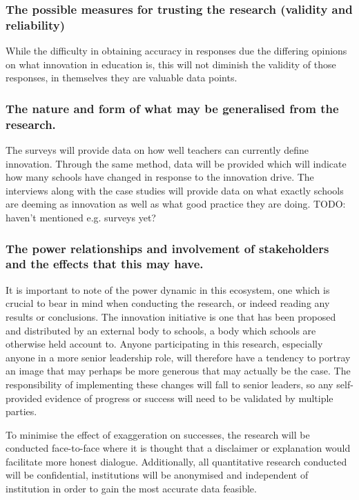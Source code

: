 \subsubsection{The possible measures for trusting the research (validity and reliability)}
While the difficulty in obtaining accuracy in responses due the differing opinions on what innovation in education is, this will not diminish the validity of those responses, in themselves they are valuable data points. 

\subsubsection{The nature and form of what may be generalised from the research.}
The surveys will provide data on how well teachers can currently define innovation. Through the same method, data will be provided which will indicate how many schools have changed in response to the innovation drive. The interviews along with the case studies will provide data on what exactly schools are deeming as innovation as well as what good practice they are doing. TODO: haven't mentioned e.g. surveys yet?

\subsubsection{The power relationships and involvement of stakeholders and the effects that this may have.}

It is important to note of the power dynamic in this ecosystem, one which is crucial to bear in mind when conducting the research, or indeed reading any results or conclusions. The innovation initiative is one that has been proposed and distributed by an external body to schools, a body which schools are otherwise held account to. Anyone participating in this research, especially anyone in a more senior leadership role, will therefore have a tendency to portray an image that may perhaps be more generous that may actually be the case. The responsibility of implementing these changes will fall to senior leaders, so any self-provided evidence of progress or success will need to be validated by multiple parties.

To minimise the effect of exaggeration on successes, the research will be conducted face-to-face where it is thought that a disclaimer or explanation would facilitate more honest dialogue. Additionally, all quantitative research conducted will be confidential, institutions will be anonymised  and independent of institution in order to gain the most accurate data feasible. 

